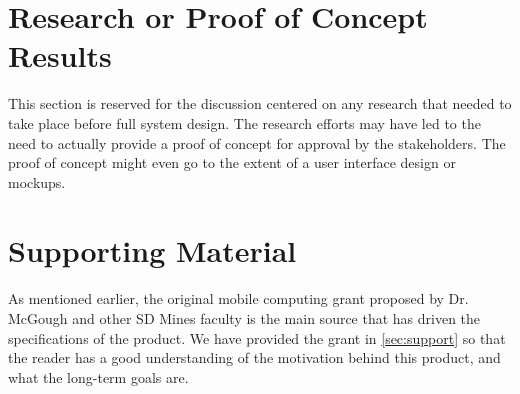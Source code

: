 \section{Research or Proof of Concept Results}
This section is reserved for the discussion centered on any research that needed 
to take place before full system design.  The research efforts may have led to 
the need to actually provide a proof of concept for approval by the stakeholders. 
 The proof of concept might even go to the extent of a user interface design or 
mockups. 


\section{Supporting Material}


As mentioned earlier, the original mobile computing grant proposed by Dr. 
McGough and other SD Mines faculty is the main source that has driven the 
specifications of the product. We have provided the grant in 
\autoref{sec:support} so that the reader has a good understanding of the 
motivation behind this product, and what the long-term goals are.

